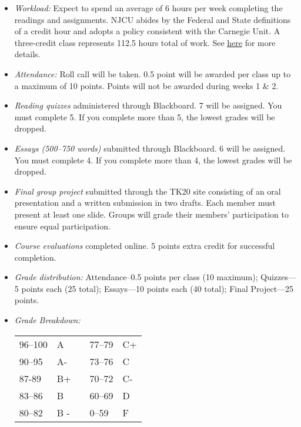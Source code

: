\documentclass[article,oneside]{memoir}
\begin{document}
\begin{itemize}
\item \textit{Workload:} Expect to spend an average of 6 hours per week completing the readings and assignments. NJCU abides by the Federal and State definitions of a credit hour and adopts a policy consistent with the Carnegie Unit. A three-credit class represents 112.5 hours total of work. See \href{http://scoconno.github.io/Teaching/Credit.pdf}{here} for more details.

\item \textit{Attendance:} Roll call will be taken. 0.5 point will be awarded per class up to a maximum of 10 points. Points will not be awarded during weeks 1 \& 2. 

\item \textit{Reading quizzes} administered through Blackboard. 7 will be assigned. You must complete 5. If you complete more than 5, the lowest grades will be dropped. 


\item \textit{Essays (500--750 words)} submitted through Blackboard.  6 will be assigned. You must complete 4. If you complete more than 4, the lowest grades will be dropped. 

\item \textit{Final group project} submitted through the TK20 site consisting of an oral presentation and a written submission in two drafts. Each member must present at least one slide. Groups will grade their members' participation to ensure equal participation. 

\item \textit{Course evaluations} completed online. 5 points extra credit for successful completion.
  
\item \textit{Grade distribution:} Attendance--0.5 points per class (10 maximum); Quizzes---5 points each (25 total);  Essays---10 points each (40 total); Final Project---25 points.


\item \textit{Grade Breakdown:}

 \begin{tabular}{ | l | l | p{2cm} | l | l | }
    \hline 
96--100 & A  & &  77--79 &  C+ \\  
90--95 & A- & &  73--76 & C \\
87-89 & B+ &  &  70--72 & C- \\ 
83--86 & B  & &  60--69 & D\\
80--82 & B - & & 0--59 & F\\ \hline
    \end{tabular}


\end{itemize}
\end{document}
